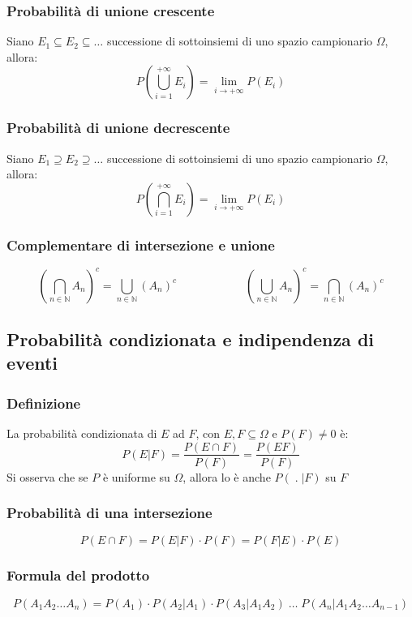 \documentclass[a4paper]{article}
\begin{document}
\subsubsection*{Probabilità di unione crescente}
Siano \(E_1 \subseteq E_2 \subseteq \dots\) successione di sottoinsiemi di uno spazio campionario \(\Omega\), allora:
\[P(\bigcup_{i=1}^{+\infty} E_i) = \lim_{i \to +\infty} P(E_i)\]

\subsubsection*{Probabilità di unione decrescente}
Siano \(E_1 \supseteq E_2 \supseteq \dots\) successione di sottoinsiemi di uno spazio campionario \(\Omega\), allora:
\[P(\bigcap_{i=1}^{+\infty} E_i) = \lim_{i \to +\infty} P(E_i)\]

\subsubsection*{Complementare di intersezione e unione}
\[\left(\bigcap_{n \in \mathbb{N}} A_n\right)^c = \bigcup_{n \in \mathbb{N}} (A_n)^c \qquad \qquad \qquad \left(\bigcup_{n \in \mathbb{N}} A_n\right)^c = \bigcap_{n \in \mathbb{N}} (A_n)^c\]

\newpage

\subsection{Probabilità condizionata e indipendenza di eventi}
\subsubsection*{Definizione}
La probabilità condizionata di \(E\) ad \(F\), con \(E,F \subseteq \Omega\) e \(P(F) \neq 0\) è:
\[P(E | F) = \frac{P(E \cap F)}{P(F)} = \frac{P(EF)}{P(F)}\]
Si osserva che se \(P\) è uniforme su \(\Omega\), allora lo è anche \(P(\;.\;|F)\) su \(F\)

\subsubsection*{Probabilità di una intersezione}
\[P(E \cap F) = P(E | F) \cdot P(F) = P(F | E) \cdot P(E)\]

\subsubsection*{Formula del prodotto}
\[P(A_1 A_2 \dots A_n) = P(A_1) \cdot P(A_2 | A_1) \cdot P(A_3 | A_1 A_2) \; \dots \; P(A_n | A_1 A_2 \dots A_{n-1})\]
\end{document}

